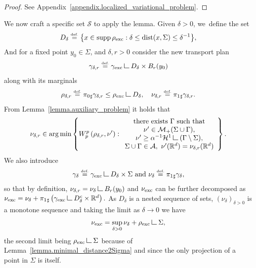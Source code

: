 \documentclass[JEP,XML,SOM,Unicode,NoFloatCountersInSection,published]{cedram}
\theoremstyle{definition}
\newcommand{\eqdef}{\ensuremath{\stackrel{\mbox{\upshape\tiny def.}}{=}}}
\newcommand\LM[1]{\hbox{\vrule width.5pt \vbox to#1pt{\vfill \hrule width#1pt height.5pt}}}
\newcommand\LL{{\mathchoice {\>\LM7\>}{\>\LM7\>}{\,\LM5\,}{\,\LM{3.35}\,}}}
\newcommand{\mres}{\LL}
\newcommand{\RR}{\mathbb{R}}
\DeclareMathOperator*{\argmin}{arg\,min}
\DeclareMathOperator{\dist}{dist}
\DeclareMathOperator{\supp}{supp}
\newcommand{\nuexc}{\nu_{\textup{exc}}}
\newcommand{\rhoexc}{\rho_{\textup{exc}}}
\newcommand{\gammaexc}{\gamma_{\textup{exc}}}
\begin{document}
\begin{proof} See Appendix~\ref{appendix.localized_variational_problem}.
\end{proof}
We now craft a specific set $\mathcal{S}$ to apply the lemma.
Given $\delta>0$, we~define the
set
\begin{equation} \label{set_D_delta}
D_{\delta} \eqdef
\bigl\{
x \in \supp\rhoexc :
\delta \le \dist(x, \Sigma) \le \delta^{-1}
\bigr\},
\end{equation}
And for a fixed point $y_0 \in \Sigma$, and $\delta,r>0$ consider the new transport plan
\begin{equation}\label{gamma_delta}
\gamma_{\delta, r} \eqdef \gammaexc \mres D_{\delta}\times B_r(y_0)
\end{equation}
along with its marginals\vspace*{-3pt}
\begin{equation}\label{nu_delta}
\rho_{\delta, r} \eqdef {\pi_{0}}_\sharp\gamma_{\delta,r} \le \rhoexc \mres D_{\delta},
\quad
\nu_{\delta, r} \eqdef {\pi_{1}}_\sharp\gamma_{\delta, r}.
\end{equation}
From Lemma~\ref{lemma.auxiliary_problem} it holds that
\begin{equation}\label{auxiliary_problem}
\nu_{\delta, r}
\in
\argmin
\left\{
W_p^p\left(
\rho_{\delta, r}, \nu'
\right) :
\begin{array}{c}
\text{there exists $\Gamma$ such that}\\
\nu' \in \mathcal{M}_+(\Sigma \cup \Gamma),\\
\nu' \ge \alpha^{-1}\mathcal{H}^1\mres (\Gamma\setminus\Sigma), \\
\Sigma \cup \Gamma \in \mathcal{A}, \
\nu'(\RR^d) = \nu_{\delta, r}(\RR^d)
\end{array}
\right\}.
\end{equation}
We also introduce\vspace*{-3pt}
\begin{equation}\label{measure_nu_delta}
\gamma_\delta\eqdef\gammaexc\mres D_{\delta}\times\Sigma
\text{ and }
\nu_\delta \eqdef {\pi_1}_\sharp \gamma_\delta,
\end{equation}
so that by definition, $\nu_{\delta, r} = \nu_\delta \mres B_r(y_0)$ and $\nuexc$ can be further decomposed as
$
\nuexc = \nu_\delta + {\pi_{1}}_\sharp\left(\gammaexc \mres D_\delta^c \times \RR^d\right).
$
As $D_\delta$ is a nested sequence of sets, $(\nu_\delta)_{\delta > 0}$ is a monotone sequence and taking the limit as $\delta \to 0$ we have
\begin{equation}\label{nuexc.further_decomposition}
\nuexc = \sup_{\delta > 0} \nu_\delta + \rhoexc\mres \Sigma,
\end{equation}
the second limit being $\rhoexc\mres \Sigma$ because
of Lemma~\ref{lemma.minimal_distance2Sigma} and
since the only projection of a point in $\Sigma$ is itself.
\end{document}
